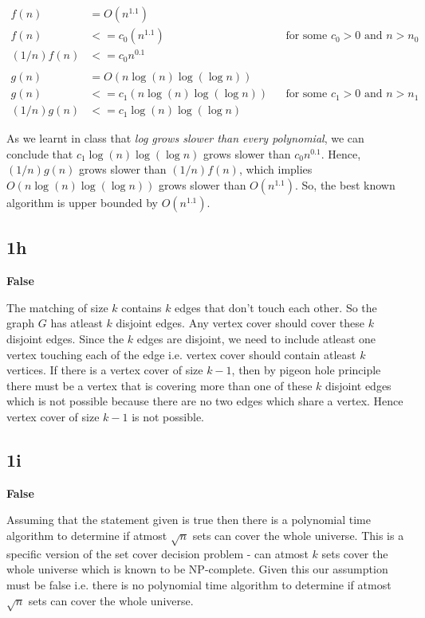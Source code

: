\documentclass{article}
\begin{document}
    \begin{align*}
        f(n) & = O(n^{1.1}) \\
        f(n) & <= c_0(n^{1.1}) && \text{for some $c_0 > 0$ and $n > n_0$} \\
        (1/n)f(n) & <= c_0 n^{0.1} \\
        \\
        g(n) & = O(n \log(n) \log(\log n)) \\
        g(n) & <= c_1(n \log(n) \log(\log n)) && \text{for some $c_1 > 0$ and $n > n_1$} \\
        (1/n)g(n) & <= c_1 \log(n) \log(\log n)
    \end{align*}

    As we learnt in class that \textit{log grows slower than every polynomial}, we can conclude that $c_1 \log(n) \log(\log n)$ grows slower than $c_0 n^{0.1}$. Hence, $(1/n)g(n)$ grows slower than $(1/n)f(n)$, which implies $O(n \log(n) \log(\log n))$ grows slower than $O(n^{1.1})$. So, the best known algorithm is upper bounded by $O(n^{1.1})$.

    \subsection*{1h}
    \textbf{False}

    The matching of size $k$ contains $k$ edges that don't touch each other. So the graph $G$ has atleast $k$ disjoint edges. Any vertex cover should cover these $k$ disjoint edges. Since the $k$ edges are disjoint, we need to include atleast one vertex touching each of the edge i.e. vertex cover should contain atleast $k$ vertices. If there is a vertex cover of size $k-1$, then by pigeon hole principle there must be a vertex that is covering more than one of these $k$ disjoint edges which is not possible because there are no two edges which share a vertex. Hence vertex cover of size $k-1$ is not possible.

    \subsection*{1i}
    \textbf{False}

    Assuming that the statement given is true then there is a polynomial time algorithm to determine if atmost $\sqrt n$ sets can cover the whole universe. This is a specific version of the set cover decision problem - can atmost $k$ sets cover the whole universe which is known to be NP-complete. Given this our assumption must be false i.e. there is no polynomial time algorithm to determine if atmost $\sqrt n$ sets can cover the whole universe.
\end{document}
